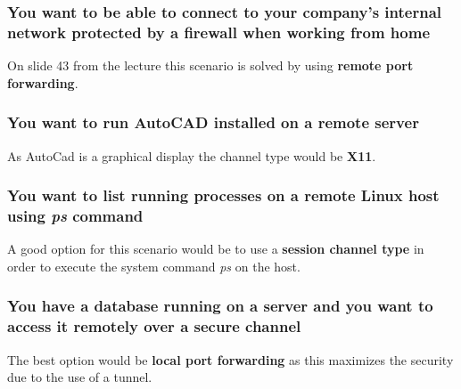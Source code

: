 \documentclass{report}
\begin{document}
			\subsubsection{You want to be able to connect to your company's internal network protected by a firewall when working from home}
			\startsubsection
				On slide 43 from the lecture this scenario is solved by using \textbf{remote port forwarding}.
			\closesection
			\subsubsection{You want to run AutoCAD installed on a remote server}
			\startsubsection
				As AutoCad is a graphical display the channel type would be \textbf{X11}.
			\closesection
			\subsubsection{You want to list running processes on a remote Linux host using \textit{ps} command}
			\startsubsection
				A good option for this scenario would be to use a \textbf{session channel type} in order to execute the system command \textit{ps} on the host.
			\closesection
			\subsubsection{You have a database running on a server and you want to access it remotely over a secure channel}
			\startsubsection
				The best option would be \textbf{local port forwarding} as this maximizes the security due to the use of a tunnel.
			\closesection
		\closesection
	\closesection
\end{document}
